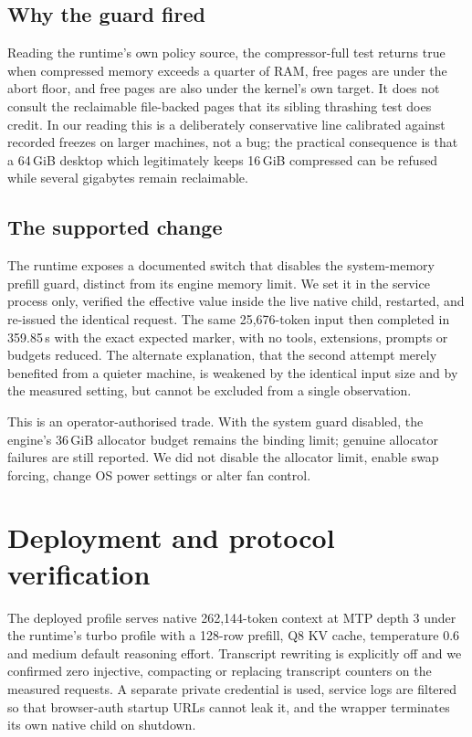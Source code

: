 \documentclass[11pt]{article}
\begin{document}
\subsection{Why the guard fired}
Reading the runtime's own policy source, the compressor-full test returns true when compressed memory exceeds a quarter of RAM, free pages are under the abort floor, and free pages are also under the kernel's own target. It does not consult the reclaimable file-backed pages that its sibling thrashing test does credit. In our reading this is a deliberately conservative line calibrated against recorded freezes on larger machines, not a bug; the practical consequence is that a 64\,GiB desktop which legitimately keeps 16\,GiB compressed can be refused while several gigabytes remain reclaimable.

\subsection{The supported change}
The runtime exposes a documented switch that disables the system-memory prefill guard, distinct from its engine memory limit. We set it in the service process only, verified the effective value inside the live native child, restarted, and re-issued the identical request. The same 25{,}676-token input then completed in 359.85\,s with the exact expected marker, with no tools, extensions, prompts or budgets reduced. The alternate explanation, that the second attempt merely benefited from a quieter machine, is weakened by the identical input size and by the measured setting, but cannot be excluded from a single observation.

This is an operator-authorised trade. With the system guard disabled, the engine's 36\,GiB allocator budget remains the binding limit; genuine allocator failures are still reported. We did not disable the allocator limit, enable swap forcing, change OS power settings or alter fan control.

\section{Deployment and protocol verification}
The deployed profile serves native 262{,}144-token context at MTP depth 3 under the runtime's turbo profile with a 128-row prefill, Q8 KV cache, temperature 0.6 and medium default reasoning effort. Transcript rewriting is explicitly off and we confirmed zero injective, compacting or replacing transcript counters on the measured requests. A separate private credential is used, service logs are filtered so that browser-auth startup URLs cannot leak it, and the wrapper terminates its own native child on shutdown.
\end{document}
